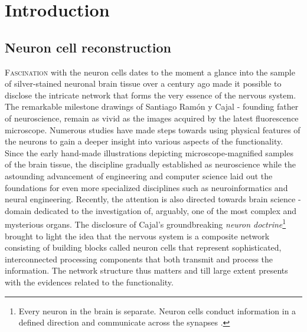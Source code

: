 %
%
\chpos{22mm}{10mm}

\chapter[Introduction]{Introduction}
\label{ch1:introduction}


\section{Neuron cell reconstruction} 
\lettrine{F}{ascination} with the neuron cells dates to the moment a glance into the sample of silver-stained neuronal brain tissue over a century ago made it possible to disclose the intricate network that forms the very essence of the nervous system. The remarkable milestone drawings of Santiago Ram\'{o}n y Cajal \cite{swanson2017,ramon2008histologia} - founding father of neuroscience, remain as vivid as the images acquired by the latest fluorescence microscope. Numerous studies \cite{defelipe2013new,defelipe2002microstructure,defelipe1992pyramidal,van2001need,scorcioni2004quantitative,mason2007initiation,gensel2010semi} have made steps towards using physical features of the neurons to gain a deeper insight into various aspects of the functionality. Since the early hand-made illustrations depicting microscope-magnified samples of the brain tissue, the discipline gradually established as neuroscience \cite{kandel2000principles} while the astounding advancement of engineering and computer science laid out the foundations for even more specialized disciplines such as neuroinformatics and neural engineering. Recently, the attention is also directed towards brain science - domain dedicated to the investigation of, arguably, one of the most complex and mysterious organs. The disclosure of Cajal's groundbreaking \textit{neuron doctrine}\footnote{Every neuron in the brain is separate. Neuron cells conduct information in a defined direction and communicate across the synapses \cite{glickstein2006golgi}.} brought to light the idea that the nervous system is a composite network consisting of building blocks called neuron cells that represent sophisticated, interconnected processing components that both transmit and process the information. The network structure thus matters and till large extent presents with the evidences related to the functionality. 

